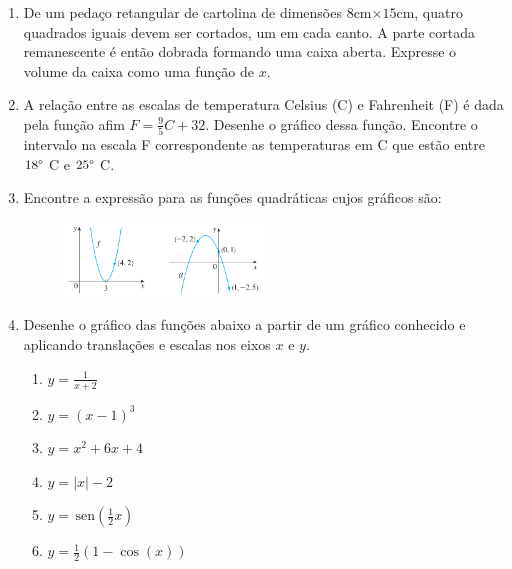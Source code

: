 \documentclass[a4paper,5pt]{amsbook}
\newcommand{\sen}{\,\mbox{sen}}
\begin{document}
\begin{enumerate}
    \vspace{0.5cm}
    \item De um peda\c{c}o retangular de cartolina de dimens\~oes $8$cm$\times 15$cm,
        quatro quadrados iguais devem ser cortados, um em cada canto. A parte
        cortada remanescente \'e ent\~ao dobrada formando uma caixa aberta.
        Expresse o volume da caixa como uma fun\c{c}\~ao de $x$.

    \vspace{0.5cm}
    \item A rela\c{c}\~ao entre as escalas de temperatura Celsius (C) e Fahrenheit
        (F) \'e dada pela fun\c{c}\~ao afim $F=\displaystyle\frac{9}{5}C+32$. Desenhe o
        gr\'afico dessa fun\c{c}\~ao. Encontre o intervalo na escala F correspondente
        as temperaturas em C que est\~ao entre $18\degree$ C e $25\degree$ C.

    \vspace{0.5cm}
    \item Encontre a express\~ao para as fun\c{c}\~oes quadr\'aticas cujos gr\'aficos s\~ao:
        \begin{figure}[h]
            \centering
            \includegraphics[width=0.5\textwidth]{lista-03-fig2.png}
        \end{figure}

    \vspace{0.5cm}
    \item Desenhe o gr\'afico das fun\c{c}\~oes abaixo a partir de um gr\'afico conhecido
        e aplicando transla\c{c}\~oes e escalas nos eixos $x$ e $y$.
        \begin{enumerate}
            \vspace{0.3cm}
            \item $y=\displaystyle\frac{1}{x+2}$
            \vspace{0.3cm}
            \item $y={(x-1)}^3$
            \vspace{0.3cm}
            \item $y=x^2+6x+4$
            \vspace{0.3cm}
            \item $y=|x|-2$
            \vspace{0.3cm}
            \item $y=\sen\left(\displaystyle\frac{1}{2}x\right)$
            \vspace{0.3cm}
            \item $y=\displaystyle\frac{1}{2}\left(1-\cos(x)\right)$
        \end{enumerate}


\end{enumerate}
\end{document}
